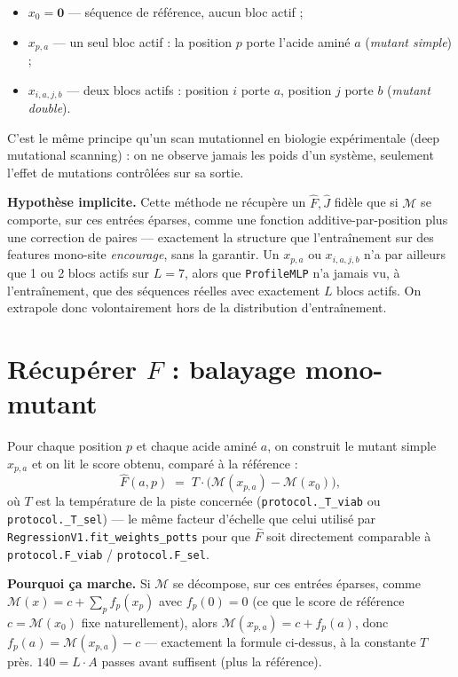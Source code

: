 \documentclass[11pt,a4paper]{article}
\newcommand{\M}{\mathcal{M}}
\begin{document}
\begin{itemize}
    \item $x_0 = \mathbf 0$ --- séquence de référence, aucun bloc actif ;
    \item $x_{p,a}$ --- un seul bloc actif : la position $p$ porte l'acide aminé $a$
          (\emph{mutant simple}) ;
    \item $x_{i,a,j,b}$ --- deux blocs actifs : position $i$ porte $a$, position $j$ porte $b$
          (\emph{mutant double}).
\end{itemize}

C'est le même principe qu'un scan mutationnel en biologie expérimentale (deep mutational
scanning) : on ne observe jamais les poids d'un système, seulement l'effet de mutations
contrôlées sur sa sortie.

\begin{mdframed}
\textbf{Hypothèse implicite.} Cette méthode ne récupère un $\hat F,\hat J$ fidèle que si
$\M$ se comporte, sur ces entrées éparses, comme une fonction additive-par-position plus une
correction de paires --- exactement la structure que l'entraînement sur des features
mono-site \emph{encourage}, sans la garantir. Un $x_{p,a}$ ou $x_{i,a,j,b}$ n'a par ailleurs
que 1 ou 2 blocs actifs sur $L=7$, alors que \texttt{ProfileMLP} n'a jamais vu, à
l'entraînement, que des séquences réelles avec exactement $L$ blocs actifs. On extrapole donc
volontairement hors de la distribution d'entraînement.
\end{mdframed}

\section{Récupérer $F$ : balayage mono-mutant}

Pour chaque position $p$ et chaque acide aminé $a$, on construit le mutant simple $x_{p,a}$ et
on lit le score obtenu, comparé à la référence :
\[
    \hat F(a, p) \;=\; T \cdot \big(\M(x_{p,a}) - \M(x_0)\big),
\]
où $T$ est la température de la piste concernée (\texttt{protocol.\_T\_viab} ou
\texttt{protocol.\_T\_sel}) --- le même facteur d'échelle que celui utilisé par
\texttt{RegressionV1.fit\_weights\_potts} pour que $\hat F$ soit directement comparable à
\texttt{protocol.F\_viab} / \texttt{protocol.F\_sel}.

\textbf{Pourquoi ça marche.} Si $\M$ se décompose, sur ces entrées éparses, comme
$\M(x) = c + \sum_p f_p(x_p)$ avec $f_p(0)=0$ (ce que le score de référence $c=\M(x_0)$ fixe
naturellement), alors $\M(x_{p,a}) = c + f_p(a)$, donc $f_p(a) = \M(x_{p,a}) - c$ --- exactement
la formule ci-dessus, à la constante $T$ près. $140 = L\cdot A$ passes avant suffisent (plus la
référence).
\end{document}
